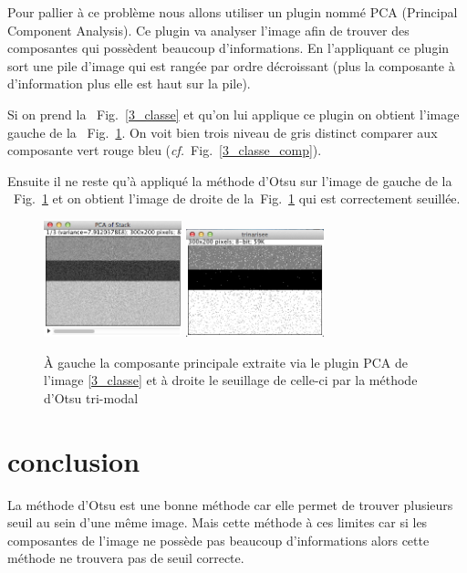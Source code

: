 \documentclass[a4paper,10pt]{article}
\begin{document}
Pour pallier \`a ce probl\`eme nous allons utiliser un plugin nomm\'e PCA (Principal Component Analysis). Ce plugin va analyser l'image afin de trouver des composantes qui poss\`edent beaucoup d'informations. En l'appliquant ce plugin sort une pile d'image qui est rang\'ee par ordre d\'ecroissant (plus la composante \`a d'information plus elle est haut sur la pile).

Si on prend la ~Fig.~\ref{3_classe} et qu'on lui applique ce plugin on obtient l'image gauche de la  ~Fig.~\ref{3_classe_comp_prin}. On voit bien trois niveau de gris distinct comparer aux composante vert rouge bleu (\emph{cf.}~Fig.~\ref{3_classe_comp}). 

Ensuite il ne reste qu'\`a appliqu\'e la m\'ethode d'Otsu sur l'image de gauche de la ~Fig.~\ref{3_classe_comp_prin} et on obtient l'image de droite de la~Fig.~\ref{3_classe_comp_prin} qui est correctement seuill\'ee.

\begin{figure}[ht]
\begin{center}
	\includegraphics[width=4cm]{images/3_classe_composante}
	\includegraphics[width=4cm]{images/3_classe_trinaire}
\end{center}
	\caption{\`A gauche la composante principale extraite via le plugin PCA de l'image \ref{3_classe} et \`a droite le seuillage de celle-ci par la m\'ethode d'Otsu tri-modal}
	\label{3_classe_comp_prin}
\end{figure}

\section*{conclusion}

La m\'ethode d'Otsu est une bonne m\'ethode car elle permet de trouver plusieurs seuil au sein d'une m\^eme image. Mais cette m\'ethode \`a ces limites car si les composantes de l'image ne poss\`ede pas beaucoup d'informations alors cette m\'ethode ne trouvera pas de seuil correcte.
\end{document}
